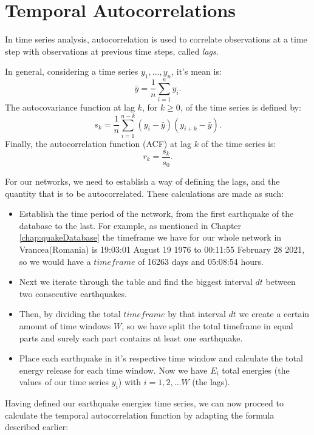 \clearpage
\section{Temporal Autocorrelations}
In time series analysis, autocorrelation is used to correlate observations at a time step with observations at previous time steps, called {\it lags}.\par 
In general, considering a time series $y_1,...,y_n$, it's mean is:
\begin{equation}
\bar{y}=\frac{1}{n}\sum_{i=1}^n y_i.
\end{equation}
The autocovariance function at lag $k$, for $k \geq 0$, of the time series is defined by:
\begin{equation}
s_k = \frac{1}{n}\sum_{i=1}^{n-k}(y_i - \bar{y})(y_{i+k} - \bar{y}).
\end{equation}
Finally, the autocorrelation function (ACF) at lag $k$ of the time series is:
\begin{equation}
r_k = \frac{s_k}{s_0}.
\end{equation}

For our networks, we need to establish a way of defining the lags, and the quantity that is to be autocorrelated. These calculations are made as such:

\begin{itemize}
	\item Establish the time period of the network, from the first earthquake of the database to the last. For example, as mentioned in Chapter \ref{chap:quakeDatabase} the timeframe we have for our whole network in Vrancea(Romania) is 19:03:01 August 19 1976 to 00:11:55 February 28 2021, so we would have a $timeframe$ of 16263 days and 05:08:54 hours.
	\item Next we iterate through the table and find the biggest interval $dt$ between two consecutive earthquakes. 
	\item Then, by dividing the total $timeframe$ by that interval $dt$ we create a certain amount of time windows $W$, so we have split the total timeframe in equal parts and surely each part contains at least one earthquake.
	\item Place each earthquake in it's respective time window and calculate the total energy release for each time window. Now we have $E_i$ total energies (the values of our time series $y_i$) with $i = 1,2,...W$ (the lags).
\end{itemize}
Having defined our earthquake energies time series, we can now proceed to calculate the temporal autocorrelation function by adapting the formula described earlier:\par


